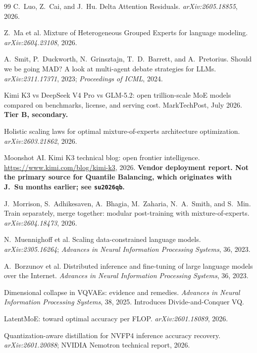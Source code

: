 \documentclass[11pt]{article}
\begin{document}
\begin{thebibliography}{99}
 C.~Luo, Z.~Cai, and J.~Hu. Delta Attention Residuals. \emph{arXiv:2605.18855}, 2026.

 Z.~Ma et al. Mixture of Heterogeneous Grouped Experts for language modeling. \emph{arXiv:2604.23108}, 2026.

 A.~Smit, P.~Duckworth, N.~Grinsztajn, T.~D.~Barrett, and A.~Pretorius. Should we be going MAD? A look at multi-agent debate strategies for LLMs. \emph{arXiv:2311.17371}, 2023; \emph{Proceedings of ICML}, 2024.

 Kimi K3 vs DeepSeek V4 Pro vs GLM-5.2: open trillion-scale MoE models compared on benchmarks, license, and serving cost. MarkTechPost, July 2026. \textbf{Tier B, secondary.}

 Holistic scaling laws for optimal mixture-of-experts architecture optimization. \emph{arXiv:2603.21862}, 2026.

 Moonshot AI. Kimi K3 technical blog: open frontier intelligence. \url{https://www.kimi.com/blog/kimi-k3}, 2026. \textbf{Vendor deployment report. Not the primary source for Quantile Balancing, which originates with J.~Su months earlier; see \texttt{su2026qb}.}

 J.~Morrison, S.~Adhikesaven, A.~Bhagia, M.~Zaharia, N.~A.~Smith, and S.~Min. Train separately, merge together: modular post-training with mixture-of-experts. \emph{arXiv:2604.18473}, 2026.

 N.~Muennighoff et al. Scaling data-constrained language models. \emph{arXiv:2305.16264}; \emph{Advances in Neural Information Processing Systems}, 36, 2023.

 A.~Borzunov et al. Distributed inference and fine-tuning of large language models over the Internet. \emph{Advances in Neural Information Processing Systems}, 36, 2023.

 Dimensional collapse in VQVAEs: evidence and remedies. \emph{Advances in Neural Information Processing Systems}, 38, 2025. Introduces Divide-and-Conquer VQ.

 LatentMoE: toward optimal accuracy per FLOP. \emph{arXiv:2601.18089}, 2026.

 Quantization-aware distillation for NVFP4 inference accuracy recovery. \emph{arXiv:2601.20088}; NVIDIA Nemotron technical report, 2026.


\end{thebibliography}
\end{document}
